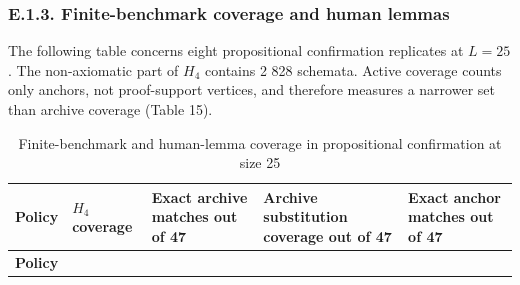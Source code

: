 \documentclass[pdflatex,sn-basic,Numbered]{sn-jnl}
\begin{document}
\subsubsection*{E.1.3. Finite-benchmark coverage and human lemmas}\label{e.1.3.-finite-benchmark-coverage-and-human-lemmas}

The following table concerns eight propositional confirmation replicates at \(L = 25\). The non-axiomatic part of \(H_{4}\) contains 2 828 schemata. Active coverage counts only anchors, not proof-support vertices, and therefore measures a narrower set than archive coverage (Table 15).

\begingroup
\small
\setlength{\tabcolsep}{3pt}
\renewcommand{\arraystretch}{1.13}

\begin{longtable}[]{@{}
  >{\raggedright\arraybackslash}p{}
  >{\raggedleft\arraybackslash}p{}
  >{\raggedleft\arraybackslash}p{}
  >{\raggedleft\arraybackslash}p{}
  >{\raggedleft\arraybackslash}p{}@{}}
\caption{Finite-benchmark and human-lemma coverage in propositional confirmation at size 25}\label{tab:15}\tabularnewline
\toprule\noalign{}
\begin{minipage}[b]{\linewidth}\raggedright
\textbf{Policy}
\end{minipage} & \begin{minipage}[b]{\linewidth}\raggedleft
\(H_{4}\) \textbf{coverage}
\end{minipage} & \begin{minipage}[b]{\linewidth}\raggedleft
\textbf{Exact archive matches out of 47}
\end{minipage} & \begin{minipage}[b]{\linewidth}\raggedleft
\textbf{Archive substitution coverage out of 47}
\end{minipage} & \begin{minipage}[b]{\linewidth}\raggedleft
\textbf{Exact anchor matches out of 47}
\end{minipage} \\
\midrule\noalign{}
\endfirsthead
\toprule\noalign{}
\begin{minipage}[b]{\linewidth}\raggedright
\textbf{Policy}
\end{minipage} & \begin{minipage}[b]{\linewidth}\raggedleft

\end{minipage}
\end{longtable}
\end{document}
